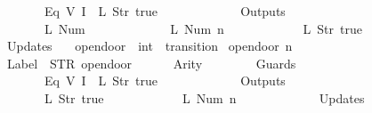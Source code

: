 \begin{isabellebody}
\ \ \ \ \ \ \ \ \ \ \ \ {\isacharparenleft}Eq\ {\isacharparenleft}V\ {\isacharparenleft}I\ {}{\isacharparenright}{\isacharparenright}\ {\isacharparenleft}L\ {\isacharparenleft}Str\ {\isacharprime}{\isacharprime}true{\isacharprime}{\isacharprime}{\isacharparenright}{\isacharparenright}{\isacharparenright}\isanewline
\ \ \ \ \ \ {\isacharbrackright}{\isacharcomma}\isanewline
\ \ \ \ \ \ Outputs\ {\isacharequal}\ {\isacharbrackleft}\isanewline
\ \ \ \ \ \ \ \ \ \ \ \ {\isacharparenleft}L\ {\isacharparenleft}Num\ {}{\isacharparenright}{\isacharparenright}{\isacharcomma}\isanewline
\ \ \ \ \ \ \ \ \ \ \ \ {\isacharparenleft}L\ {\isacharparenleft}Num\ n{\isacharparenright}{\isacharparenright}{\isacharcomma}\isanewline
\ \ \ \ \ \ \ \ \ \ \ \ {\isacharparenleft}L\ {\isacharparenleft}Str\ {\isacharprime}{\isacharprime}true{\isacharprime}{\isacharprime}{\isacharparenright}{\isacharparenright}\isanewline
\ \ \ \ \ \ {\isacharbrackright}{\isacharcomma}\isanewline
\ \ \ \ \ \ Updates\ {\isacharequal}\ {\isacharbrackleft}{\isacharbrackright}\isanewline
{\isasymrparr}{\isachardoublequoteclose}\isanewline
\isanewline
{}\isamarkupfalse%
\ opendoor\ {\isacharcolon}{\isacharcolon}\ {\isachardoublequoteopen}int\ {\isasymRightarrow}\ transition{\isachardoublequoteclose}\ \isanewline
{\isachardoublequoteopen}opendoor\ n\ {\isasymequiv}\ {\isasymlparr}\isanewline
\ \ \ \ \ \ Label\ {\isacharequal}\ STR\ {\isacharprime}{\isacharprime}opendoor{\isacharprime}{\isacharprime}{\isacharcomma}\isanewline
\ \ \ \ \ \ Arity\ {\isacharequal}\ {}{\isacharcomma}\isanewline
\ \ \ \ \ \ Guards\ {\isacharequal}\ {\isacharbrackleft}\isanewline
\ \ \ \ \ \ \ \ \ \ \ \ {\isacharparenleft}Eq\ {\isacharparenleft}V\ {\isacharparenleft}I\ {}{\isacharparenright}{\isacharparenright}\ {\isacharparenleft}L\ {\isacharparenleft}Str\ {\isacharprime}{\isacharprime}true{\isacharprime}{\isacharprime}{\isacharparenright}{\isacharparenright}{\isacharparenright}\isanewline
\ \ \ \ \ \ {\isacharbrackright}{\isacharcomma}\isanewline
\ \ \ \ \ \ Outputs\ {\isacharequal}\ {\isacharbrackleft}\isanewline
\ \ \ \ \ \ \ \ \ \ \ \ {\isacharparenleft}L\ {\isacharparenleft}Str\ {\isacharprime}{\isacharprime}true{\isacharprime}{\isacharprime}{\isacharparenright}{\isacharparenright}{\isacharcomma}\isanewline
\ \ \ \ \ \ \ \ \ \ \ \ {\isacharparenleft}L\ {\isacharparenleft}Num\ n{\isacharparenright}{\isacharparenright}\isanewline
\ \ \ \ \ \ {\isacharbrackright}{\isacharcomma}\isanewline
\ \ \ \ \ \ Updates\ {\isacharequal}\ {\isacharbrackleft}{\isacharbrackright}\isanewline

\end{isabellebody}
